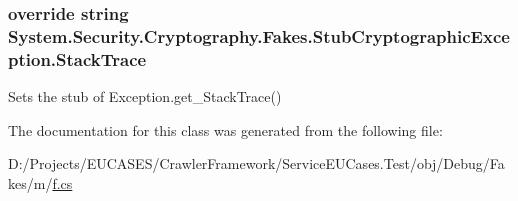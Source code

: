 \hypertarget{class_system_1_1_security_1_1_cryptography_1_1_fakes_1_1_stub_cryptographic_exception_a2677c9eb88d698dcb7c256ede72fb8c5}{
\subsubsection[{Stack\-Trace}]{\setlength{\rightskip}{0pt plus 5cm}override string System.\-Security.\-Cryptography.\-Fakes.\-Stub\-Cryptographic\-Exception.\-Stack\-Trace\hspace{0.3cm}{\ttfamily [get]}}}\label{class_system_1_1_security_1_1_cryptography_1_1_fakes_1_1_stub_cryptographic_exception_a2677c9eb88d698dcb7c256ede72fb8c5}


Sets the stub of Exception.\-get\-\_\-\-Stack\-Trace()



The documentation for this class was generated from the following file\-:\begin{DoxyCompactItemize}
\item 
D\-:/\-Projects/\-E\-U\-C\-A\-S\-E\-S/\-Crawler\-Framework/\-Service\-E\-U\-Cases.\-Test/obj/\-Debug/\-Fakes/m/\hyperlink{m_2f_8cs}{f.\-cs}\end{DoxyCompactItemize}
